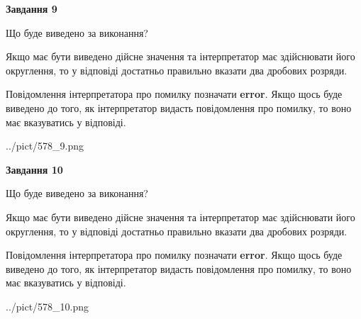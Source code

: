 \documentclass[12pt, ukrainian]{article}
\begin{document}
{\begin {Large}
{\begin {center}\textbf{Завдання 9}\end {center}}\par
Що буде виведено за виконання? \par

Якщо має бути виведено дійсне значення та інтерпретатор має здійснювати його округлення, 
то у відповіді достатньо правильно вказати два дробових розряди.

Повідомлення інтерпретатора про помилку позначати \textbf{error}.
Якщо щось буде виведено до того, як інтерпретатор видасть повідомлення про помилку, 
то воно має вказуватись у відповіді. \par

\begin{center}
	{../pict/578_9.png}
\end{center}
\newpage

{\begin {center}\textbf{Завдання 10}\end {center}}\par
Що буде виведено за виконання? \par

Якщо має бути виведено дійсне значення та інтерпретатор має здійснювати його округлення, 
то у відповіді достатньо правильно вказати два дробових розряди.

Повідомлення інтерпретатора про помилку позначати \textbf{error}.
Якщо щось буде виведено до того, як інтерпретатор видасть повідомлення про помилку, 
то воно має вказуватись у відповіді. \par

\begin{center}
	{../pict/578_10.png}
\end{center}
\newpage

\end {Large}}
\end{document}
